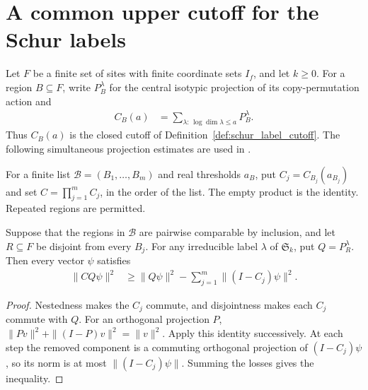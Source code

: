 \section{A common upper cutoff for the Schur labels}
\label{sec:schur-common-cutoffs}

Let $F$ be a finite set of sites with finite coordinate sets $I_f$,
and let $k\ge0$. For a region $B\subseteq F$, write
$P_B^\lambda$ for the central isotypic projection of its copy-permutation
action and
\begin{align}
 C_B(a)&=\sum_{\lambda:\,\log\dim\lambda\le a}P_B^\lambda.
\end{align}
Thus $C_B(a)$ is the closed cutoff of
Definition~\ref{def:schur_label_cutoff}. The following simultaneous
projection estimates are used in
\cite[Section~7, lines~332--354]{OpenAI2026AreaLaw}.

\begin{definition}
\label{def:schur-common-cutoff}
    \leanok
{}
For a finite list $\mathcal B=(B_1,\ldots,B_m)$ and real thresholds
$a_B$, put $C_j=C_{B_j}(a_{B_j})$ and set
$C=\prod_{j=1}^m C_j$, in the order of the list.
The empty product is the identity. Repeated regions are permitted.
\end{definition}

\begin{theorem}
\label{thm:schur-common-cutoff-mass}
    \leanok
{}
Suppose that the regions in $\mathcal B$ are pairwise comparable by
inclusion, and let $R\subseteq F$ be disjoint from every $B_j$.
For any irreducible label $\lambda$ of $\mathfrak S_k$, put
$Q=P_R^\lambda$. Then every vector $\psi$ satisfies
\begin{align}
 \|CQ\psi\|^2
 &\ge \|Q\psi\|^2-\sum_{j=1}^m\|(I-C_j)\psi\|^2.
\end{align}
\end{theorem}
\begin{proof}
    \leanok
Nestedness makes the $C_j$ commute, and disjointness makes each $C_j$
commute with $Q$. For an orthogonal projection $P$,
$\|Pv\|^2+\|(I-P)v\|^2=\|v\|^2$.
Apply this identity successively. At each step the removed component is
a commuting orthogonal projection of $(I-C_j)\psi$, so its norm is
at most $\|(I-C_j)\psi\|$. Summing the losses gives the inequality.
\end{proof}

